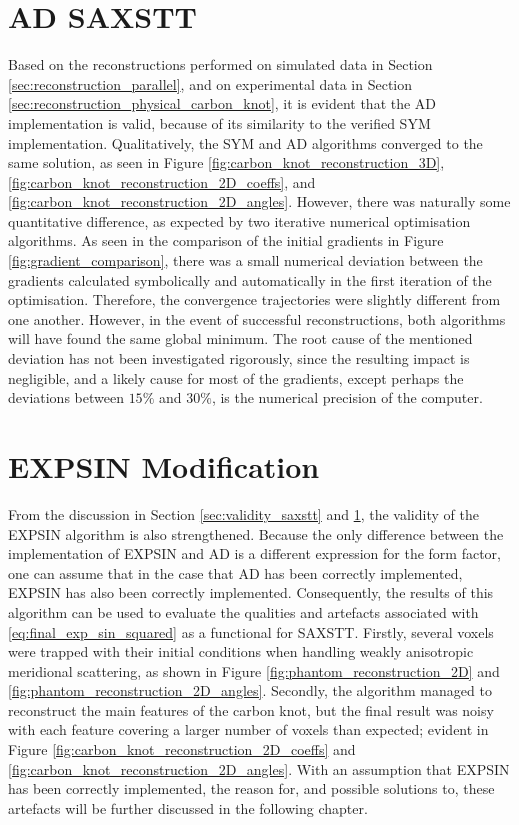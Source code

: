 


\section{AD SAXSTT}\label{sec:ad_validation}
Based on the reconstructions performed on simulated data in Section \ref{sec:reconstruction_parallel},
and on experimental data in Section \ref{sec:reconstruction_physical_carbon_knot},
it is evident that the AD implementation is valid, because of its similarity to the verified SYM implementation.
Qualitatively, the SYM and AD algorithms converged to the same solution, as seen in Figure \ref{fig:carbon_knot_reconstruction_3D}, \ref{fig:carbon_knot_reconstruction_2D_coeffs}, and \ref{fig:carbon_knot_reconstruction_2D_angles}.
However, there was naturally some quantitative difference, as expected by two iterative numerical optimisation algorithms.
As seen in the comparison of the initial gradients in Figure \ref{fig:gradient_comparison},
there was a small numerical deviation between the gradients calculated symbolically and automatically in the first iteration of the optimisation.
Therefore, the convergence trajectories were slightly different from one another. However, in the event of successful reconstructions,
both algorithms will have found the same global minimum.
The root cause of the mentioned deviation has not been investigated rigorously, since the resulting impact is negligible,
and a likely cause for most of the gradients, except perhaps the deviations between $15\%$ and $30\%$, is the numerical precision of the computer.


\section{EXPSIN Modification}\label{sec:saxstt_validation}
From the discussion in Section \ref{sec:validity_saxstt} and \ref{sec:ad_validation}, the validity of the EXPSIN algorithm is also strengthened.
Because the only difference between the implementation of EXPSIN and AD is a different expression for the form factor,
one can assume that in the case that AD has been correctly implemented, EXPSIN has also been correctly implemented.
Consequently, the results of this algorithm can be used to evaluate the qualities and artefacts associated with \eqref{eq:final_exp_sin_squared} as a functional for SAXSTT.
Firstly, several voxels were trapped with their initial conditions when handling weakly anisotropic meridional scattering, as shown in Figure \ref{fig:phantom_reconstruction_2D} and \ref{fig:phantom_reconstruction_2D_angles}.
Secondly, the algorithm managed to reconstruct the main features of the carbon knot, but the final result was noisy with each feature covering a larger number of voxels than expected; evident in Figure \ref{fig:carbon_knot_reconstruction_2D_coeffs} and \ref{fig:carbon_knot_reconstruction_2D_angles}.
With an assumption that EXPSIN has been correctly implemented, the reason for, and possible solutions to, these artefacts will be further discussed in the following chapter.

